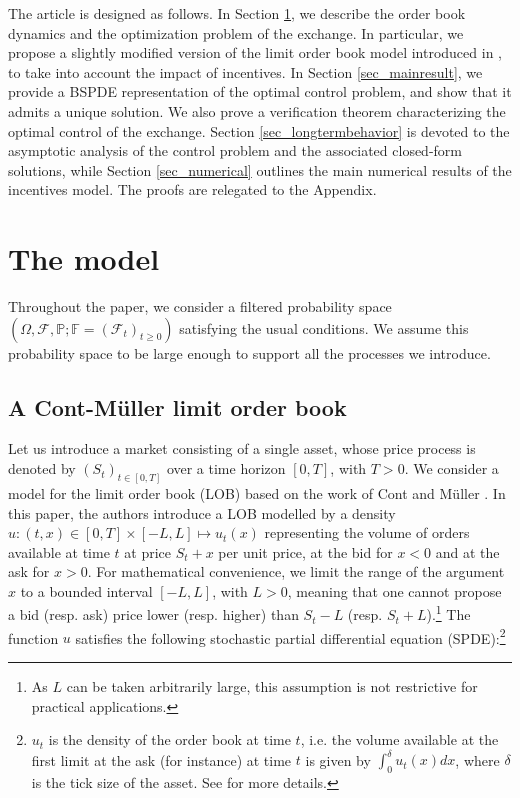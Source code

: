 \documentclass[11pt]{article}
\begin{document}
The article is designed as follows. In Section \ref{sec_model}, we describe the order book dynamics and the optimization problem of the exchange. In particular, we propose a slightly modified version of the limit order book model introduced in \cite{cont2021stochastic}, to take into account the impact of incentives. In Section \ref{sec_mainresult}, we provide a BSPDE representation of the optimal control problem, and show that it admits a unique solution. We also prove a verification theorem characterizing the optimal control of the exchange. Section \ref{sec_longtermbehavior} is devoted to the asymptotic analysis of the control problem and the associated closed-form solutions, while Section \ref{sec_numerical} outlines the main numerical results of the incentives model. The proofs are relegated to the Appendix. 

\section{The model}\label{sec_model}

Throughout the paper, we consider a filtered probability space $\left( \Omega, \mathcal F, \mathbb P; \mathbb F = (\mathcal F_t)_{t \ge 0} \right)$ satisfying the usual conditions. We assume this probability space to be large enough to support all the processes we introduce.

\subsection{A Cont-M\"uller \cite{cont2021stochastic} limit order book}

Let us introduce a market consisting of a single asset, whose price process is denoted by $(S_t)_{t \in [0,T]}$ over a time horizon $[0,T]$, with $T>0.$ We consider a model for the limit order book (LOB) based on the work of Cont and M\"uller \cite{cont2021stochastic}. In this paper, the authors introduce a LOB modelled by a density $u:(t,x) \in [0,T] \times [-L,L] \mapsto u_t(x) $ representing the volume of orders available at time $t$ at price $S_t + x$ per unit price, at the bid for $x<0$ and at the ask for $x>0$. For mathematical convenience, we limit the range of the argument $x$ to a bounded interval $[-L,L]$, with $L>0$, meaning that one cannot propose a bid (resp. ask) price lower (resp. higher) than $S_t-L$ (resp. $S_t+L$).\footnote{As $L$ can be taken arbitrarily large, this assumption is not restrictive for practical applications.} The function $u$ satisfies the following stochastic partial differential equation (SPDE):\footnote{$u_t$ is the density of the order book at time $t$, i.e. the volume available at the first limit at the ask (for instance) at time $t$ is given by $\int_0^\delta u_t (x) dx$, where $\delta$ is the tick size of the asset. See \cite{cont2021stochastic} for more details.}
\end{document}
